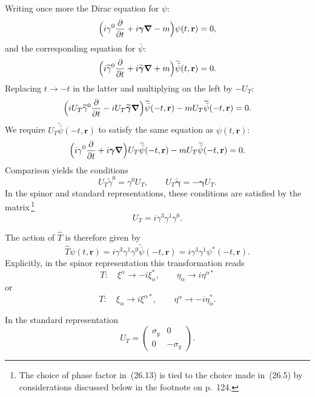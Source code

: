 Writing once more the Dirac equation for $\psi$:
\[
\Bigl(i\gamma^0\frac{\partial}{\partial t} + i\boldsymbol{\gamma}\boldsymbol{\nabla} - m\Bigr)\psi(t,\mathbf{r}) = 0,
\]
and the corresponding equation for $\bar\psi$:
\[
\Bigl(i\widetilde\gamma^0\frac{\partial}{\partial t} + i\widetilde{\boldsymbol{\gamma}}\boldsymbol{\nabla} + m\Bigr)\widetilde{\bar\psi}(t,\mathbf{r}) = 0.
\]
Replacing $t \to -t$ in the latter and multiplying on the left by $-U_T$:
\[
\Bigl(iU_T\widetilde\gamma^0\frac{\partial}{\partial t} - iU_T\widetilde{\boldsymbol{\gamma}}\boldsymbol{\nabla}\Bigr)\widetilde{\bar\psi}(-t,\mathbf{r}) - mU_T\widetilde{\bar\psi}(-t,\mathbf{r}) = 0.
\]
We require $U_T\widetilde{\bar\psi}(-t,\mathbf{r})$ to satisfy the same equation as $\psi(t,\mathbf{r})$:
\[
\Bigl(i\gamma^0\frac{\partial}{\partial t} + i\boldsymbol{\gamma}\boldsymbol{\nabla}\Bigr)U_T\widetilde{\bar\psi}(-t,\mathbf{r}) - mU_T\widetilde{\bar\psi}(-t,\mathbf{r}) = 0.
\]
Comparison yields the conditions
\begin{equation}
U_T\widetilde\gamma^0 = \gamma^0 U_T,\qquad U_T\widetilde{\boldsymbol{\gamma}} = -\boldsymbol{\gamma}U_T.
\tag{26.12}
\end{equation}
In the spinor and standard representations, these conditions are satisfied by the matrix\,\footnote{The choice of phase factor in~(26.13) is tied to the choice made in~(26.5) by considerations discussed below in the footnote on p.~124.}
\begin{equation}
U_T = i\gamma^3\gamma^1\gamma^0.
\tag{26.13}
\end{equation}

The action of $\widehat T$ is therefore given by
\begin{equation}
\widehat T\psi(t,\mathbf{r}) = i\gamma^3\gamma^1\gamma^0\widetilde{\bar\psi}(-t,\mathbf{r}) = i\gamma^3\gamma^1\psi^*(-t,\mathbf{r}).
\tag{26.14}
\end{equation}
Explicitly, in the spinor representation this transformation reads
\begin{equation}
T:\quad \xi^\alpha \to -i\xi^*_\alpha,\qquad \eta_{\dot\alpha} \to i\eta^{\dot\alpha*}
\tag{26.15\,a}
\end{equation}
or
\begin{equation}
T:\quad \xi_\alpha \to i\xi^{\alpha*},\qquad \eta^\alpha \to -i\eta^*_{\dot\alpha}.
\tag{26.15\,b}
\end{equation}

In the standard representation
\begin{equation}
U_T = \begin{pmatrix} \sigma_y & 0\\ 0 & -\sigma_y \end{pmatrix}.
\tag{26.16}
\end{equation}


